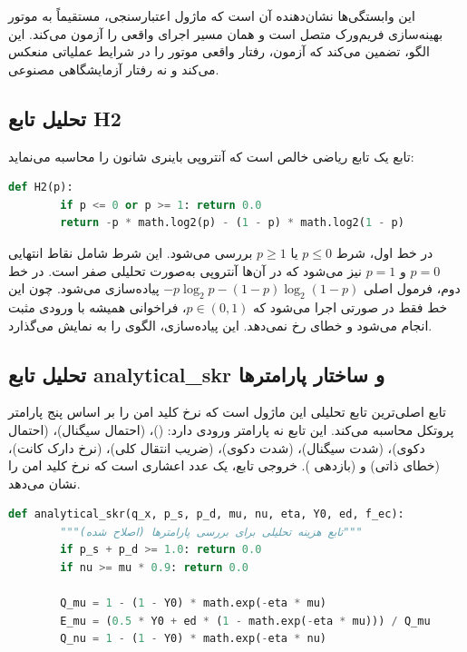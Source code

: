 این وابستگی‌ها نشان‌دهنده آن است که ماژول اعتبارسنجی، مستقیماً به موتور بهینه‌سازی فریم‌ورک متصل است و همان مسیر اجرای واقعی را آزمون می‌کند. این الگو، تضمین می‌کند که آزمون، رفتار واقعی موتور را در شرایط عملیاتی منعکس می‌کند و نه رفتار آزمایشگاهی مصنوعی.

\subsection{تحلیل تابع H2}

تابع  یک تابع ریاضی خالص است که آنتروپی باینری شانون را محاسبه می‌نماید:

\begin{LTR}
	\begin{lstlisting}[language=Python]
		def H2(p):
		if p <= 0 or p >= 1: return 0.0
		return -p * math.log2(p) - (1 - p) * math.log2(1 - p)
	\end{lstlisting}
\end{LTR}

در خط اول، شرط $p \leq 0$ یا $p \geq 1$ بررسی می‌شود. این شرط شامل نقاط انتهایی $p = 0$ و $p = 1$ نیز می‌شود که در آن‌ها آنتروپی به‌صورت تحلیلی صفر است. در خط دوم، فرمول اصلی $-p \log_2 p - (1-p) \log_2(1-p)$ پیاده‌سازی می‌شود. چون این خط فقط در صورتی اجرا می‌شود که $p \in (0, 1)$، فراخوانی  همیشه با ورودی مثبت انجام می‌شود و خطای  رخ نمی‌دهد. این پیاده‌سازی، الگوی  را به نمایش می‌گذارد.

\subsection{تحلیل تابع analytical\_skr و ساختار پارامترها}

تابع  اصلی‌ترین تابع تحلیلی این ماژول است که نرخ کلید امن را بر اساس پنج پارامتر پروتکل محاسبه می‌کند. این تابع نه پارامتر ورودی دارد:  ()،  (احتمال سیگنال)،  (احتمال دکوی)، \lr{$\mu$} (شدت سیگنال)، \lr{$\nu$} (شدت دکوی)، \lr{$\eta$} (ضریب انتقال کلی)،  (نرخ دارک کانت)،  (خطای ذاتی) و  (بازدهی ). خروجی تابع، یک عدد اعشاری است که نرخ کلید امن را نشان می‌دهد.

\begin{LTR}
	\begin{lstlisting}[language=Python]
		def analytical_skr(q_x, p_s, p_d, mu, nu, eta, Y0, ed, f_ec):
		"""تابع هزینه تحلیلی برای بررسی پارامترها (اصلاح شده)"""
		if p_s + p_d >= 1.0: return 0.0
		if nu >= mu * 0.9: return 0.0
		
		Q_mu = 1 - (1 - Y0) * math.exp(-eta * mu)
		E_mu = (0.5 * Y0 + ed * (1 - math.exp(-eta * mu))) / Q_mu
		Q_nu = 1 - (1 - Y0) * math.exp(-eta * nu)
	\end{lstlisting}
\end{LTR}

